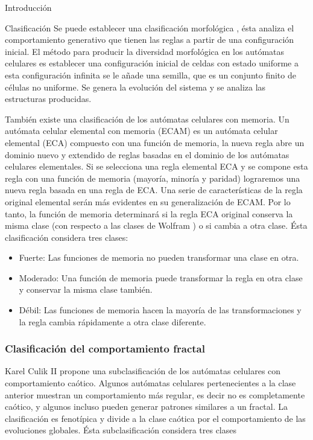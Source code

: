 \documentclass{article}
\begin{document}
\begin{section}{Introducción}
\begin{subsection}{Clasificación}
            \noindent Se puede establecer una clasificación morfológica \cite{redeker2013}\cite{adamanstky2010}, ésta analiza el comportamiento generativo que tienen las reglas a partir de una configuración inicial. El método para producir la diversidad morfológica en los autómatas celulares es establecer una configuración inicial de celdas con estado uniforme a esta configuración infinita se le añade una semilla, que es un conjunto finito de células no uniforme. Se genera la evolución del sistema y se analiza las estructuras producidas.
            
            \noindent También existe una clasificación de los autómatas celulares con memoria. Un autómata celular elemental con memoria (ECAM) es un autómata celular elemental (ECA) compuesto con una función de memoria, la nueva regla abre un dominio nuevo y extendido de reglas basadas en el dominio de los autómatas celulares elementales. Si se selecciona una regla elemental ECA y se compone esta regla con una función de memoria (mayoría, minoría y paridad) lograremos una nueva regla basada en una regla de ECA. Una serie de características de la regla original elemental serán más evidentes en su generalización de ECAM. Por lo tanto, la función de memoria determinará si la regla ECA original conserva la misma clase (con respecto a las clases de Wolfram \cite{stephenW1982}) o si cambia a otra clase.\cite{ecam} Ésta clasificación considera tres clases: 
            \begin{itemize}
                \item  Fuerte: Las funciones de memoria no pueden transformar una clase en otra.
                \item  Moderado: Una función de memoria puede transformar la regla en otra clase y conservar la misma clase también.
                \item Débil: Las funciones de memoria hacen la mayoría de las transformaciones y la regla cambia rápidamente a otra clase diferente.
            \end{itemize}
            
        \end{subsection}
        \subsubsection{Clasificación del comportamiento fractal}
        \noindent Karel Culik II propone una subclasificación de los autómatas celulares con comportamiento caótico. Algunos autómatas celulares pertenecientes a la clase anterior muestran un comportamiento más regular, es decir no es completamente caótico, y algunos incluso pueden generar patrones similares a un fractal. La clasificación es fenotípica y divide a la clase caótica por el comportamiento de las evoluciones globales. \cite{culik1989} 
        Ésta subclasificación considera tres clases
        \begin{enumerate}
           

\end{enumerate}
\end{section}
\end{document}
